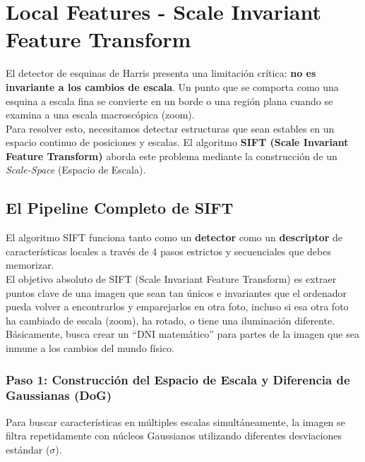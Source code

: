 \chapter{Local Features - Scale Invariant Feature Transform}

\noindent
El detector de esquinas de Harris presenta una limitación crítica: \textbf{no es invariante a los cambios de escala}. Un punto que se comporta como una esquina a escala fina se convierte en un borde o una región plana cuando se examina a una escala macroscópica (zoom). \\

\noindent
Para resolver esto, necesitamos detectar estructuras que sean estables en un espacio continuo de posiciones y escalas. El algoritmo \textbf{SIFT (Scale Invariant Feature Transform)} aborda este problema mediante la construcción de un \textit{Scale-Space} (Espacio de Escala).


\section{El Pipeline Completo de SIFT}
El algoritmo SIFT funciona tanto como un \textbf{detector} como un \textbf{descriptor} de características locales a través de 4 pasos estrictos y secuenciales que debes memorizar. \\

\noindent
El objetivo absoluto de SIFT (Scale Invariant Feature Transform) es extraer puntos clave de una imagen que sean tan únicos e invariantes que el ordenador pueda volver a encontrarlos y emparejarlos en otra foto, incluso si esa otra foto ha cambiado de escala (zoom), ha rotado, o tiene una iluminación diferente. \\

\noindent
Básicamente, busca crear un ``DNI matemático'' para partes de la imagen que sea inmune a los cambios del mundo físico.

\subsection{Paso 1: Construcción del Espacio de Escala y Diferencia de Gaussianas (DoG)}
\noindent
Para buscar características en múltiples escalas simultáneamente, la imagen se filtra repetidamente con núcleos Gaussianos utilizando diferentes desviaciones estándar ($\sigma$). 


